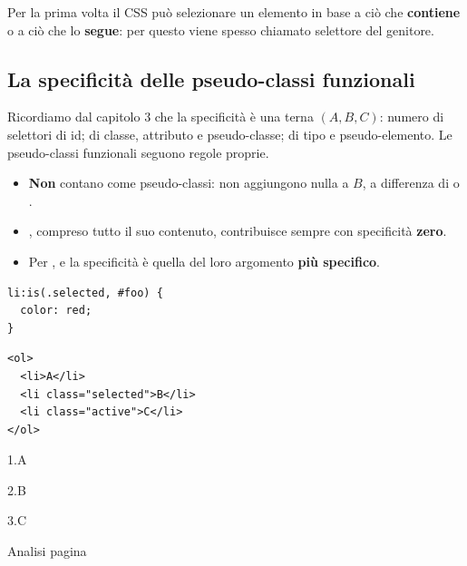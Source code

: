 Per la prima volta il CSS può selezionare un elemento in base a ciò che
\textbf{contiene} o a ciò che lo \textbf{segue}: per questo  viene
spesso chiamato \guillemotleft selettore del genitore\guillemotright.


\subsection{La specificità delle pseudo-classi funzionali}

Ricordiamo dal capitolo 3 che la specificità è una terna $(A, B, C)$: numero di
selettori di id; di classe, attributo e pseudo-classe; di tipo e
pseudo-elemento. Le pseudo-classi funzionali seguono regole proprie.

\begin{itemize}
  \item \textbf{Non} contano come pseudo-classi: non aggiungono nulla a $B$, a
        differenza di  o .
  \item {}, compreso tutto il suo contenuto, contribuisce sempre
        con specificità \textbf{zero}.
  \item Per ,  e  la specificità è quella
        del loro argomento \textbf{più specifico}.
\end{itemize}

\begin{affianco}[0.5][c]
\begin{lstlisting}[style=css, name=specificita.css]
li:is(.selected, #foo) {
  color: red;
}
\end{lstlisting}
\begin{lstlisting}[style=html, name=lista.html]
<ol>
  <li>A</li>
  <li class="selected">B</li>
  <li class="active">C</li>
</ol>
\end{lstlisting}
\risultato
\begin{browser}
  \hspace*{1.2em}1.\enspace A\par
  \hspace*{1.2em}\textcolor{css-red}{2.\enspace B}\par
  \hspace*{1.2em}3.\enspace C
\end{browser}
\begin{devtools}{Analisi pagina}
  \dtchiudi
\end{devtools}
\end{affianco}

